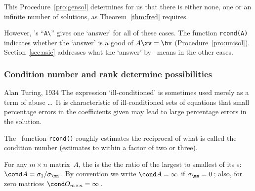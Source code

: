 This Procedure~\ref{pro:gensol} determines for us that there is either none, one or an infinite number of solutions, as Theorem~\ref{thm:fred} requires.

However,  \script's ``\verb|A\|'' gives one `answer' for all of these cases.
The function \verb|rcond(A)| indicates whether the `answer' is a good  of \(A\xv=\bv\) (Procedure~\ref{pro:unisol}).
Section~\ref{sec:asie} addresses what the `answer' by \script\ means in the other cases.





\subsubsection{Condition number and rank determine possibilities}

\begin{quoted}{Alan Turing, 1934 \cite[p.131]{Higham1996}}
The expression `ill-conditioned' is sometimes used merely as a term of abuse \ldots\ 
It is characteristic of ill-conditioned sets of equations that small percentage errors in the coefficients given may lead to large percentage errors in the solution.
\end{quoted}

The \script\ function \verb|rcond()| roughly estimates the reciprocal of what is called the condition number (estimates to within a factor of two or three).
\begin{comment}
Avoid introducing \verb|cond()| as it is expensive to compute in practice, and better learning to reinforce the ratio of singular values.
\end{comment}

\begin{definition} \label{def:condnum}
For any \(m\times n\) matrix~\(A\),
the  is the the ratio of the largest to smallest of its s: \(\cond A=\sigma_1/\sigma_{\mn}\)\,. 
By convention we write \(\cond A=\infty\) if \(\sigma_{\mn}=0\)\,; 
also, for zero matrices \(\cond O_{m\times n}=\infty\)\,.
\end{definition}

